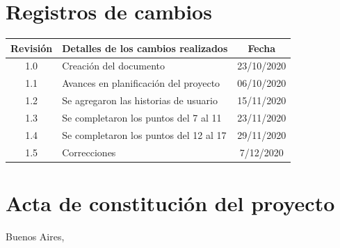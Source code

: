 \documentclass[11pt]{charter}
\begin{document}
\maketitle
\thispagestyle{empty}
\pagebreak


\thispagestyle{empty}
{\setlength{\parskip}{0pt}
\tableofcontents{}
}
\pagebreak


\section{Registros de cambios}
\label{sec:registro}


\begin{table}[ht]
\label{tab:registro}
\centering
\begin{tabularx}{\linewidth}{@{}|c|X|c|@{}}
\hline
\rowcolor[HTML]{C0C0C0} 
Revisión & \multicolumn{1}{c|}{\cellcolor[HTML]{C0C0C0}Detalles de los cambios realizados} & Fecha      \\ \hline
1.0      & Creación del documento                                          & 23/10/2020 \\ \hline
1.1      & Avances en planificación del proyecto                           & 06/10/2020 \\ \hline
1.2      & Se agregaron las historias de usuario							 & 15/11/2020 \\ \hline
1.3      & Se completaron los puntos del 7 al 11							 & 23/11/2020 \\ \hline
1.4      & Se completaron los puntos del 12 al 17							 & 29/11/2020 \\ \hline
1.5      & Correcciones													 & 7/12/2020 \\ \hline
\end{tabularx}
\end{table}

\pagebreak



\section{Acta de constitución del proyecto}
\label{sec:acta}

\begin{flushright}
Buenos Aires, \fechaInicioName
\end{flushright}
\end{document}
